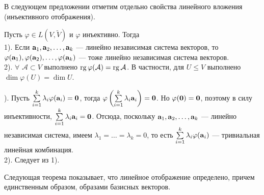 \otstup

В следующем предложении отметим отдельно свойства линейного вложения (инъективного отображения).

\begin{predl}\label{p8_1_1000}
Пусть $\varphi \in L( V, \widetilde{V})$ и $\varphi$ инъективно. Тогда
\\
1). Если $\mathbf{a}_1, \mathbf{a}_2, \ldots , \mathbf{a}_k$  --- линейно независимая система векторов, то
$\varphi(\mathbf{a}_1), \varphi(\mathbf{a}_2), \ldots , \varphi(\mathbf{a}_k)$
 --- тоже линейно независимая система векторов.\\
2). $\forall$ $\mathcal{A}\subset V$ выполнено $\mathop{\rm rg}\nolimits \varphi (\mathcal{A}) = \mathop{\rm rg}\nolimits \mathcal{A}$.
В частности, для $U\leq V$ выполнено $\dim \varphi (U) = \dim U$.
\end{predl}
). Пусть $\sum\limits_{i=1}^k \lambda _i \varphi (\mathbf{a}_i) = \mathbf{0}$, тогда
$\varphi \left(\sum\limits_{i=1}^k \lambda _i \mathbf{a}_i\right) = \mathbf{0}$. Но  $\varphi (\mathbf{0}) = \mathbf{0}$, 
поэтому в силу инъективности, $\sum\limits_{i=1}^k \lambda _i \mathbf{a}_i = \mathbf{0}$. Отсюда, поскольку 
$\mathbf{a}_1, \mathbf{a}_2, \ldots , \mathbf{a}_k$  --- линейно независимая система, имеем
$\lambda_1=\ldots = \lambda _k = 0$, то есть $\sum\limits_{i=1}^k \lambda _i \varphi (\mathbf{a}_i)$ --- тривиальная линейная комбинация.\\
2). Следует из 1).
\edok

\otstup 


Следующая теорема показывает, что
линейное отображение определено, причем единственным образом, образами базисных векторов.


